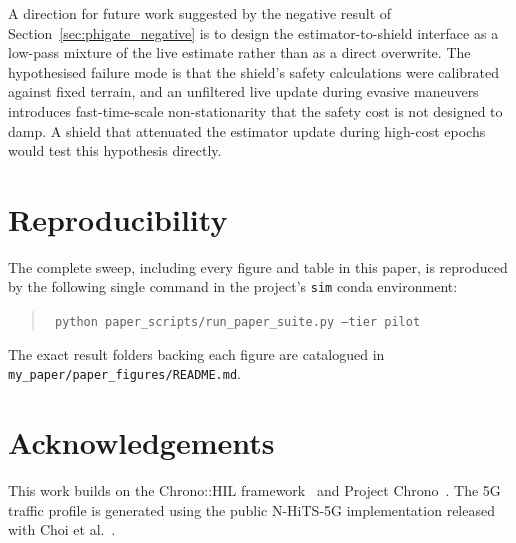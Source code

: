 \documentclass[conference,letterpaper,10pt]{IEEEtran}
\begin{document}
A direction for future work suggested by the negative result of
Section~\ref{sec:phigate_negative} is to design the
estimator-to-shield interface as a low-pass mixture of the live
estimate rather than as a direct overwrite. The hypothesised
failure mode is that the shield's safety calculations were
calibrated against fixed terrain, and an unfiltered live update
during evasive maneuvers introduces fast-time-scale non-stationarity
that the safety cost is not designed to damp. A shield that
attenuated the estimator update during high-cost epochs would test
this hypothesis directly.

\section*{Reproducibility}

The complete sweep, including every figure and table in this paper,
is reproduced by the following single command in the project's
\texttt{sim} conda environment:
\begin{quote}\small\tt
python paper\_scripts/run\_paper\_suite.py --tier pilot
\end{quote}
The exact result folders backing each figure are catalogued in
\texttt{my\_paper/paper\_figures/README.md}.

\section*{Acknowledgements}

This work builds on the Chrono::HIL framework~\cite{Zhou23} and
Project Chrono~\cite{Tasora16,Serban19}. The 5G traffic profile is
generated using the public N-HiTS-5G implementation released with
Choi et al.~\cite{Choi23}.
\end{document}
